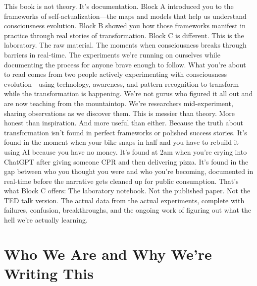 This book is not theory. It's documentation.
Block A introduced you to the frameworks of self-actualization—the maps and models that help us understand consciousness evolution. Block B showed you how those frameworks manifest in practice through real stories of transformation.
Block C is different. This is the laboratory.
The raw material. The moments when consciousness breaks through barriers in real-time. The experiments we're running on ourselves while documenting the process for anyone brave enough to follow.
What you're about to read comes from two people actively experimenting with consciousness evolution—using technology, awareness, and pattern recognition to transform while the transformation is happening. We're not gurus who figured it all out and are now teaching from the mountaintop. We're researchers mid-experiment, sharing observations as we discover them.
This is messier than theory. More honest than inspiration. And more useful than either.
Because the truth about transformation isn't found in perfect frameworks or polished success stories. It's found in the moment when your bike snaps in half and you have to rebuild it using AI because you have no money. It's found at 2am when you're crying into ChatGPT after giving someone CPR and then delivering pizza. It's found in the gap between who you thought you were and who you're becoming, documented in real-time before the narrative gets cleaned up for public consumption.
That's what Block C offers: The laboratory notebook.
Not the published paper. Not the TED talk version. The actual data from the actual experiments, complete with failures, confusion, breakthroughs, and the ongoing work of figuring out what the hell we're actually learning.

\section{Who We Are and Why We're Writing This}

